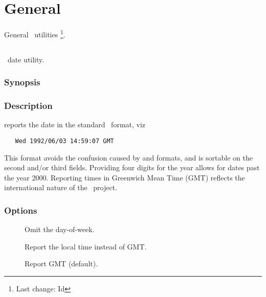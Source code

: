 \chapter{General}
\label{General}

General \aipspp\ utilities \footnote{Last change:
$ $Id$ $}.


\section{}
\label{adate}

\aipspp\ date utility.

\subsection*{Synopsis}

\begin{synopsis}
\end{synopsis}

\subsection*{Description}

 reports the date in the standard \aipspp\ format, viz

\begin{verbatim}
   Wed 1992/06/03 14:59:07 GMT
\end{verbatim}

\noindent
This format avoids the confusion caused by  and 
formats, and is sortable on the second and/or third fields.  Providing four
digits for the year allows for dates past the year 2000.  Reporting times in
Greenwich Mean Time (GMT) reflects the international nature of the \aipspp\ 
project.

\subsection*{Options}

\begin{description}
\item[]
   Omit the day-of-week.

\item[]
   Report the local time instead of GMT.

\item[]
   Report GMT (default).
\end{description}

